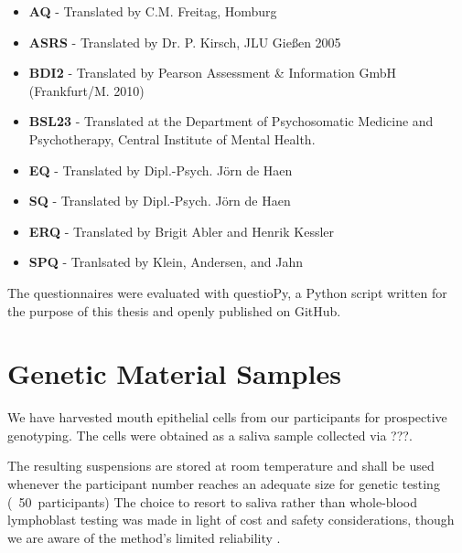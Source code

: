 	\begin{itemize}
	    \item \textbf{AQ} - Translated by C.M. Freitag, Homburg
	    \item \textbf{ASRS} - Translated by Dr. P. Kirsch, JLU Gießen 2005
	    \item \textbf{BDI2} - Translated by Pearson Assessment \& Information GmbH (Frankfurt/M. 2010)
	    \item \textbf{BSL23} - Translated at the Department of Psychosomatic Medicine and Psychotherapy, Central Institute of Mental Health.
	    \item \textbf{EQ} - Translated by Dipl.-Psych. Jörn de Haen
	    \item \textbf{SQ} - Translated by Dipl.-Psych. Jörn de Haen
	    \item \textbf{ERQ} - Translated by Brigit Abler and Henrik Kessler \citep{Abler2009}
	    \item \textbf{SPQ} - Tranlsated by Klein, Andersen, and Jahn \citep{Klein1997}
	\end{itemize}
	The questionnaires were evaluated with questioPy\citep{questiopy}, a Python script written for the purpose of this thesis and openly published on GitHub\citep{github}.
    \section{Genetic Material Samples}
	We have harvested mouth epithelial cells from our participants for prospective genotyping.
	The cells were obtained as a saliva sample collected via ???.
	
	The resulting suspensions are stored at room temperature and shall be used whenever the participant number reaches an adequate size for genetic testing (~\SI{50}{participants}) 
	The choice to resort to saliva rather than whole-blood lymphoblast testing was made in light of cost and safety considerations, though we are aware of the method's limited reliability \citep{Philibert2008}.
